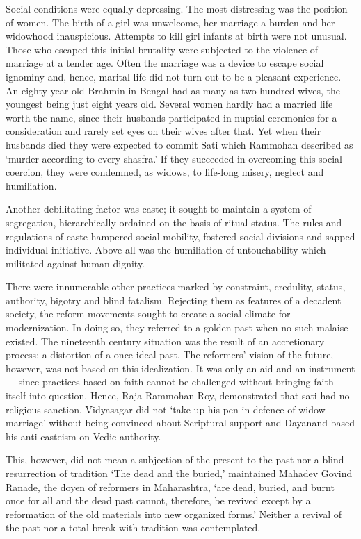 Social conditions were equally depressing. The most distressing was the position of women. The birth of a girl was unwelcome, her marriage a burden and her widowhood inauspicious. Attempts to kill girl infants at birth were not unusual. Those who escaped this initial brutality were subjected to the violence of marriage at a tender age. Often the marriage was a device to escape social ignominy and, hence, marital life did not turn out to be a pleasant experience. An eighty-year-old Brahmin in Bengal had as many as two hundred wives, the youngest being just eight years old. Several women hardly had a married life worth the name, since their husbands participated in nuptial ceremonies for a consideration and rarely set eyes on their wives after that. Yet when their husbands died they were expected to commit Sati which Rammohan described as `murder according to every shasfra.' If they succeeded in overcoming this social coercion, they were condemned, as widows, to life-long misery, neglect and humiliation.

Another debilitating factor was caste; it sought to maintain a system of segregation, hierarchically ordained on the basis of ritual status. The rules and regulations of caste hampered social mobility, fostered social divisions and sapped individual initiative. Above all was the humiliation of untouchability which militated against human dignity.

There were innumerable other practices marked by constraint, credulity, status, authority, bigotry and blind fatalism. Rejecting them as features of a decadent society, the reform movements sought to create a social climate for modernization. In doing so, they referred to a golden past when no such malaise existed. The nineteenth century situation was the result of an accretionary process; a distortion of a once ideal past. The reformers' vision of the future, however, was not based on this idealization. It was only an aid and an instrument --- since practices based on faith cannot be challenged without bringing faith itself into question. Hence, Raja Rammohan Roy, demonstrated that sati had no religious sanction, Vidyasagar did not `take up his pen in defence of widow marriage' without being convinced about Scriptural support and Dayanand based his anti-casteism on Vedic authority.

This, however, did not mean a subjection of the present to the past nor a blind resurrection of tradition `The dead and the buried,' maintained Mahadev Govind Ranade, the doyen of reformers in Maharashtra, `are dead, buried, and burnt once for all and the dead past cannot, therefore, be revived except by a reformation of the old materials into new organized forms.' Neither a revival of the past nor a total break with tradition was contemplated.

